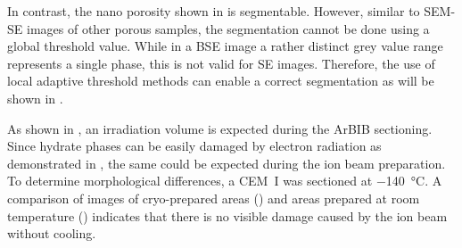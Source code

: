 In contrast, the nano porosity shown in  is segmentable.
However, similar to \ac{SEM}-\ac{SE} images of other porous samples, the segmentation cannot be done using a global threshold value.
While in a \ac{BSE} image a rather distinct grey value range represents a single phase, this is not valid for \ac{SE} images.
Therefore, the use of local adaptive threshold methods can enable a correct segmentation as will be shown in .

As shown in , an irradiation volume is expected during the \ac{ArBIB} sectioning.
Since hydrate phases can be easily damaged by electron radiation as demonstrated in , the same could be expected during the ion beam preparation.
To determine morphological differences, a CEM~I was sectioned at \qty{-140}{\celsius}.
A comparison of images of cryo-prepared areas () and areas prepared at room temperature () indicates that there is no visible damage caused by the ion beam without cooling.

